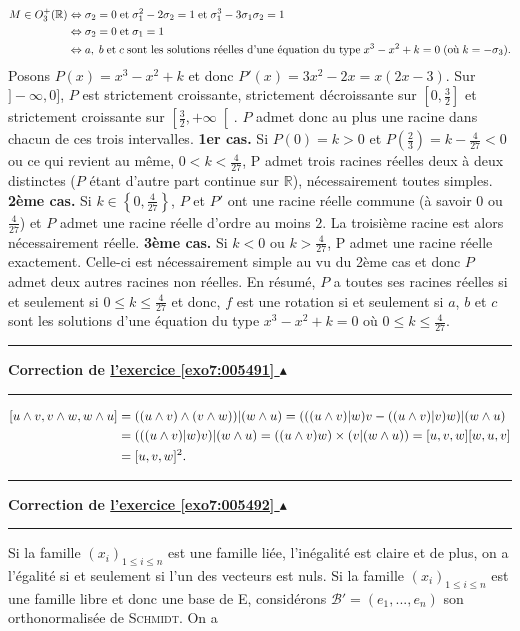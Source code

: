 \documentclass[11pt,a4paper]{article}
\newcommand{\Rr}{\mathbb{R}} \newcommand{\R}{\mathbb{R}}
\newcounter{exo}
\newcommand{\correction}[1]{\hypertarget{cor7:#1}{}\label{cor7:#1}{\bf Correction de \hyperlink{exo7:#1}{l'exercice \ref{exo7:#1} $\blacktriangle$}}\vspace{1mm}\hrule\vspace{1mm}}
\newcommand{\fincorrection}{\vspace{1mm}\hrule\vspace*{7mm}}
\begin{document}
\begin{align*}\ensuremath
M\in O_3^+(\Rr)&\Leftrightarrow\sigma_2=0\;\mbox{et}\;\sigma_1^2-2\sigma_2=1\;\mbox{et}\;\sigma_1^3-3\sigma_1\sigma_2=1\\
 &\Leftrightarrow\sigma_2=0\;\text{et}\;\sigma_1=1\\
 &\Leftrightarrow a,\;b\;\mbox{et}\;c\;\mbox{sont les solutions réelles d'une équation du type}\;x^3-x^2+k=0\;(\mbox{où}\;k=-\sigma_3).
\end{align*}
Posons $P(x)=x^3-x^2+k$ et donc $P'(x)=3x^2-2x=x(2x-3)$.
Sur $]-\infty,0]$, $P$ est strictement croissante, strictement décroissante sur $\left[0,\frac{3}{2}\right]$ et strictement croissante sur $\left[\frac{3}{2},+\infty\right[$. $P$ admet donc au plus une racine dans chacun de ces trois intervalles.
\textbf{1er cas.} Si $P(0)=k>0$ et $P\left(\frac{2}{3}\right)=k-\frac{4}{27}<0$ ou ce qui revient au même, $0<k<\frac{4}{27}$, P admet trois racines réelles deux à deux distinctes ($P$ étant d'autre part continue sur $\Rr$), nécessairement toutes simples.
\textbf{2ème cas.} Si $k\in\left\{0,\frac{4}{27}\right\}$, $P$ et $P'$ ont une racine réelle commune (à savoir $0$ ou $\frac{4}{27}$) et $P$ admet une racine réelle d'ordre au moins $2$. La troisième racine est alors nécessairement réelle.
\textbf{3ème cas.} Si $k<0$ ou $k>\frac{4}{27}$, P admet une racine réelle exactement. Celle-ci est nécessairement simple au vu du 2ème cas et donc $P$ admet deux autres racines non réelles.
En résumé, $P$ a toutes ses racines réelles si et seulement si $0\leq k\leq\frac{4}{27}$ et donc, $f$ est une rotation si et seulement si $a$, $b$ et $c$ sont les solutions d'une équation du type $x^3-x^2+k=0$ où $0\leq k\leq\frac{4}{27}$.
\fincorrection
\correction{005491}
\begin{align*}\ensuremath
[u\wedge v,v\wedge w,w\wedge u]&=((u\wedge v)\wedge(v\wedge w))|(w\wedge u)=(((u\wedge v)|w)v-((u\wedge v)|v)w)|(w\wedge u)\\
 &=(((u\wedge v)|w)v)|(w\wedge u)=((u\wedge v)w)\times(v|(w\wedge u))=[u,v,w][w,u,v]\\
 &=[u,v,w]^2.
\end{align*}
\fincorrection
\correction{005492}
Si la famille $(x_i)_{1\leq i\leq n}$ est une famille liée, l'inégalité est claire et de plus, on a l'égalité si et seulement si l'un des vecteurs est nuls.
Si la famille $(x_i)_{1\leq i\leq n}$ est une famille libre et donc une base de E, considérons $\mathcal{B}'=(e_1,...,e_n)$ son orthonormalisée de \textsc{Schmidt}. On a 
\end{document}
